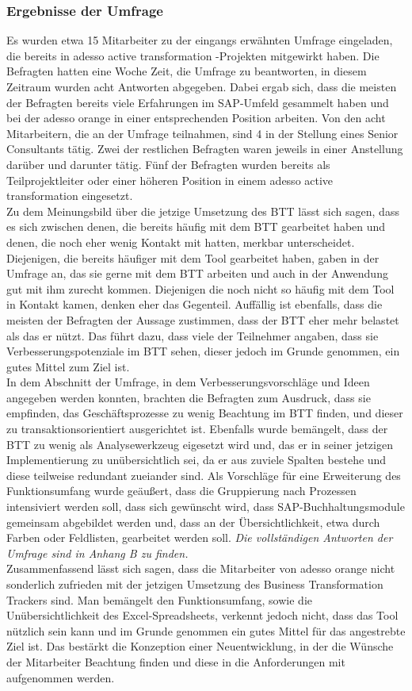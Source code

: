 \subsubsection{Ergebnisse der Umfrage}
Es wurden etwa 15 Mitarbeiter zu der eingangs erwähnten Umfrage eingeladen, die bereits in adesso active transformation -Projekten mitgewirkt haben. Die Befragten hatten eine Woche Zeit, die Umfrage zu beantworten, in diesem Zeitraum wurden acht Antworten abgegeben. Dabei ergab sich, dass die meisten der Befragten bereits viele Erfahrungen im SAP-Umfeld gesammelt haben und bei der adesso orange in einer entsprechenden Position arbeiten. Von den acht Mitarbeitern, die an der Umfrage teilnahmen, sind 4 in der Stellung eines Senior Consultants tätig. Zwei der restlichen Befragten waren jeweils in einer Anstellung darüber und darunter tätig. Fünf der Befragten wurden bereits als Teilprojektleiter oder einer höheren Position in einem adesso active transformation eingesetzt. 
\\Zu dem Meinungsbild über die jetzige Umsetzung des BTT lässt sich sagen, dass es sich zwischen denen, die bereits häufig mit dem BTT gearbeitet haben und denen, die noch eher wenig Kontakt mit hatten, merkbar unterscheidet. Diejenigen, die bereits häufiger mit dem Tool gearbeitet haben, gaben in der Umfrage an, das sie gerne mit dem BTT arbeiten und auch in der Anwendung gut mit ihm zurecht kommen. Diejenigen die noch nicht so häufig mit dem Tool in Kontakt kamen, denken eher das Gegenteil. Auffällig ist ebenfalls, dass die meisten der Befragten der Aussage zustimmen, dass der BTT eher mehr belastet als das er nützt. Das führt dazu, dass viele der Teilnehmer angaben, dass sie Verbesserungspotenziale im BTT sehen, dieser jedoch im Grunde genommen, ein gutes Mittel zum Ziel ist.\\
In dem Abschnitt der Umfrage, in dem Verbesserungsvorschläge und Ideen angegeben werden konnten, brachten die Befragten zum Ausdruck, dass sie empfinden, das Geschäftsprozesse zu wenig Beachtung im BTT finden, und dieser zu transaktionsorientiert ausgerichtet ist. Ebenfalls wurde bemängelt, dass der BTT zu wenig als Analysewerkzeug eigesetzt wird und, das er in seiner jetzigen Implementierung zu unübersichtlich sei, da er aus zuviele Spalten bestehe und diese teilweise redundant zueiander sind. Als Vorschläge für eine Erweiterung des Funktionsumfang wurde geäußert, dass die Gruppierung nach Prozessen intensiviert werden soll, dass sich gewünscht wird, dass SAP-Buchhaltungsmodule gemeinsam abgebildet werden und, dass an der Übersichtlichkeit, etwa durch Farben oder Feldlisten, gearbeitet werden soll. \emph{Die vollständigen Antworten der Umfrage sind in Anhang B zu finden.}
\\Zusammenfassend lässt sich sagen, dass die Mitarbeiter von adesso orange nicht sonderlich zufrieden mit der jetzigen Umsetzung des Business Transformation Trackers sind. Man bemängelt den Funktionsumfang, sowie die Unübersichtlichkeit des Excel-Spreadsheets, verkennt jedoch nicht, dass das Tool nützlich sein kann und im Grunde genommen ein gutes Mittel für das angestrebte Ziel ist. Das bestärkt die Konzeption einer Neuentwicklung, in der die Wünsche der Mitarbeiter Beachtung finden und diese in die Anforderungen mit aufgenommen werden. 

